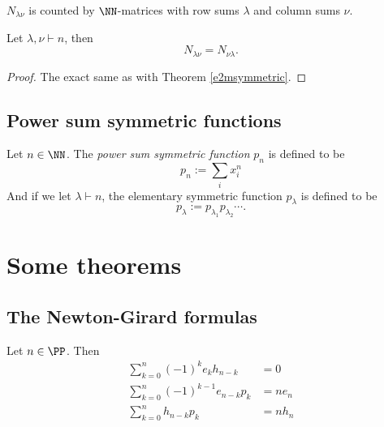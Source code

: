 \documentclass{article}
\begin{document}
\begin{theorem}
    $N_{\lambda\nu}$ is counted by $\NN$-matrices with row sums $\lambda$ and column sums $\nu$.
\end{theorem}

\begin{theorem}
    Let $\lambda, \nu \vdash n$, then
    \[
        N_{\lambda\nu} = N_{\nu\lambda}.
    \]
\end{theorem}

\begin{proof}
    The exact same as with Theorem \ref{e2msymmetric}.
\end{proof}
    
\subsection{Power sum symmetric functions}

\begin{definition}
    Let $n\in\NN$. The \textit{power sum symmetric function} $p_n$ is defined to be
    \[
        p_n := \sum_{i} x_i^n
    \]
    And if we let $\lambda \vdash n$, the elementary symmetric function $p_\lambda$ is defined to be
    \[
        p_\lambda := p_{\lambda_1}p_{\lambda_2}\cdots.
    \]
\end{definition}

\section{Some theorems}

\subsection{The Newton-Girard formulas}

\begin{theorem}
    Let $n \in \PP$. Then
    \begin{align}
        \sum_{k=0}^n (-1)^k e_kh_{n-k} &= 0 \label{ng1} \\
        \sum_{k=0}^n (-1)^{k-1} e_{n-k}p_k &= ne_n  \label{ng2} \\
        \sum_{k=0}^n h_{n-k}p_k &= nh_n \label{ng3}
    \end{align}
\end{theorem}
\end{document}
